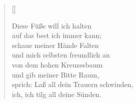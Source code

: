 \begin{center}
\settowidth{\versewidth}{Der, vor dem die Welt erschrickt,}
\begin{verse}[\versewidth]

 Diese Füße will ich halten\\
auf das best ich immer kann;\\
schaue meiner Hände Falten\\
und mich selbsten freundlich an\\
von dem hohen Kreuzesbaum\\
und gib meiner Bitte Raum,\\
sprich: Laß all dein Trauern schwinden,\\
ich, ich tilg all deine Sünden.

\end{verse}
\end{center}

